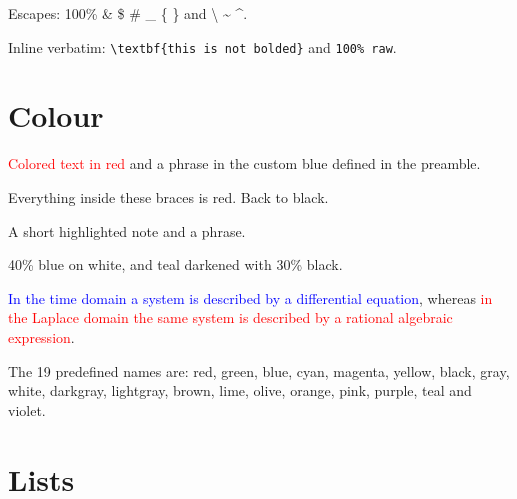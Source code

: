 \documentclass[11pt,a4paper]{article}
\theoremstyle{definition}                   %
\begin{document}
Escapes: 100\% \& \$ \# \_ \{ \} and \textbackslash{} \~{} \^{}.

\bigskip
Inline verbatim: \verb|\textbf{this is not bolded}| and \verb+100% raw+.


\section{Colour}

\textcolor{red}{Colored text in red} and
\textcolor{customblue}{a phrase in the custom blue defined in the preamble}.

{\color{red} Everything inside these braces is red.} Back to black.

A \colorbox{softyellow}{short highlighted note} and a
 phrase.

\textcolor{blue!40}{40\% blue on white}, and
\textcolor{teal!70!black}{teal darkened with 30\% black}.

\medskip
\textcolor{blue}{In the time domain a system is described by a differential
equation}, whereas \textcolor{red}{in the Laplace domain the same system is
described by a rational algebraic expression}.

The 19 predefined names are: red, green, blue, cyan, magenta, yellow, black,
gray, white, darkgray, lightgray, brown, lime, olive, orange, pink, purple,
teal and violet.


\section{Lists}
\end{document}
